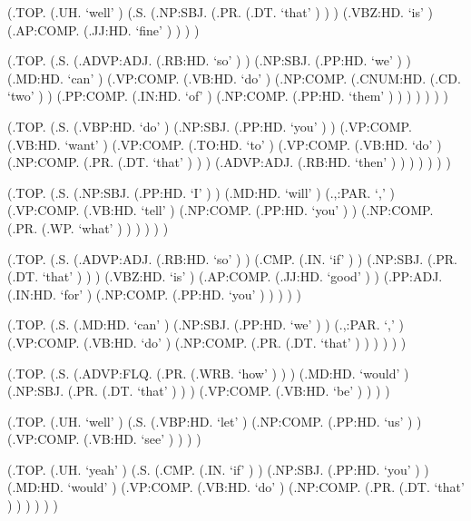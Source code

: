 \documentclass[10pt]{article}
\begin{document}
\begin{parsetree}  (.TOP. (.UH. `well' ) (.S. (.NP:SBJ. (.PR. (.DT. `that' ) ) ) (.VBZ:HD. `is' ) (.AP:COMP. (.JJ:HD. `fine' ) ) ) ) \end{parsetree}

\begin{parsetree}  (.TOP. (.S. (.ADVP:ADJ. (.RB:HD. `so' ) ) (.NP:SBJ. (.PP:HD. `we' ) ) (.MD:HD. `can' ) (.VP:COMP. (.VB:HD. `do' ) (.NP:COMP. (.CNUM:HD. (.CD. `two' ) ) (.PP:COMP. (.IN:HD. `of' ) (.NP:COMP. (.PP:HD. `them' ) ) ) ) ) ) ) \end{parsetree}

\begin{parsetree}  (.TOP. (.S. (.VBP:HD. `do' ) (.NP:SBJ. (.PP:HD. `you' ) ) (.VP:COMP. (.VB:HD. `want' ) (.VP:COMP. (.TO:HD. `to' ) (.VP:COMP. (.VB:HD. `do' ) (.NP:COMP. (.PR. (.DT. `that' ) ) ) (.ADVP:ADJ. (.RB:HD. `then' ) ) ) ) ) ) ) \end{parsetree}

\begin{parsetree}  (.TOP. (.S. (.NP:SBJ. (.PP:HD. `I' ) ) (.MD:HD. `will' ) (.,:PAR. `,' ) (.VP:COMP. (.VB:HD. `tell' ) (.NP:COMP. (.PP:HD. `you' ) ) (.NP:COMP. (.PR. (.WP. `what' ) ) ) ) ) ) \end{parsetree}

\begin{parsetree}  (.TOP. (.S. (.ADVP:ADJ. (.RB:HD. `so' ) ) (.CMP. (.IN. `if' ) ) (.NP:SBJ. (.PR. (.DT. `that' ) ) ) (.VBZ:HD. `is' ) (.AP:COMP. (.JJ:HD. `good' ) ) (.PP:ADJ. (.IN:HD. `for' ) (.NP:COMP. (.PP:HD. `you' ) ) ) ) ) \end{parsetree}

\begin{parsetree}  (.TOP. (.S. (.MD:HD. `can' ) (.NP:SBJ. (.PP:HD. `we' ) ) (.,:PAR. `,' ) (.VP:COMP. (.VB:HD. `do' ) (.NP:COMP. (.PR. (.DT. `that' ) ) ) ) ) ) \end{parsetree}

\begin{parsetree}  (.TOP. (.S. (.ADVP:FLQ. (.PR. (.WRB. `how' ) ) ) (.MD:HD. `would' ) (.NP:SBJ. (.PR. (.DT. `that' ) ) ) (.VP:COMP. (.VB:HD. `be' ) ) ) ) \end{parsetree}

\begin{parsetree}  (.TOP. (.UH. `well' ) (.S. (.VBP:HD. `let' ) (.NP:COMP. (.PP:HD. `us' ) ) (.VP:COMP. (.VB:HD. `see' ) ) ) ) \end{parsetree}

\begin{parsetree}  (.TOP. (.UH. `yeah' ) (.S. (.CMP. (.IN. `if' ) ) (.NP:SBJ. (.PP:HD. `you' ) ) (.MD:HD. `would' ) (.VP:COMP. (.VB:HD. `do' ) (.NP:COMP. (.PR. (.DT. `that' ) ) ) ) ) ) \end{parsetree}
\end{document}
